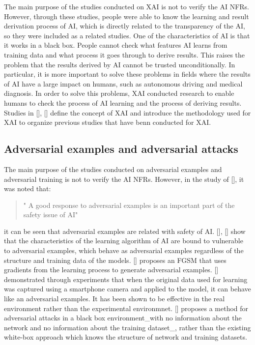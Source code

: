 \documentclass[journal,article,submit,moreauthors,pdftex]{Definitions/mdpi}
\begin{document}
The main purpose of the studies conducted on XAI is not to verify the AI NFRs.
However, through these studies, people were able to know the learning and result derivation process of AI, which is directly related to the transparency of the AI, so they were included as a related studies.
One of the characteristics of AI is that it works in a black box. People cannot check what features AI learns from training data and what process it goes through to derive results.
This raises the problem that the results derived by AI cannot be trusted unconditionally.
In particular, it is more important to solve these problems in fields where the results of AI have a large impact on humans, such as autonomous driving and medical diagnosis.
In order to solve this problems, XAI conducted research to enable humans to check the process of AI learning and the process of deriving results.
Studies in [], [] define the concept of XAI and introduce the methodology used for XAI to organize previous studies that have benn conducted for XAI.

\subsection{Adversarial examples and adversarial attacks}

The main purpose of the studies conducted on adversarial examples and adversarial training is not to verify the AI NFRs.
However, in the study of [], it was noted that:
\begin{quote}
   " A good response to adversarial examples is an important part of the safety issue of AI"
\end{quote}
it can be seen that adversarial examples are related with safety of AI.
[], [] show that the characteristics of the learning algorithm of AI are bound to vulnerable to adversarial examples, which behave as adversarial examples regardless of the structure and training data of the models.
[] proposes an FGSM that uses gradients from the learning process to generate adversarial examples.
[] demonstrated through experiments that when the original data used for learning was captured using a smartphone camera and applied to the model, it can behave like an adversarial examples. It has been shown to be effective in the real environment rather than the experimental environmnet.
[] proposes a method for adversarial attacks in a black box environment\_with no information about the network and no information about the training dataset\_, rather than the existing white-box approach which knows the structure of network and training datasets.
\end{document}

